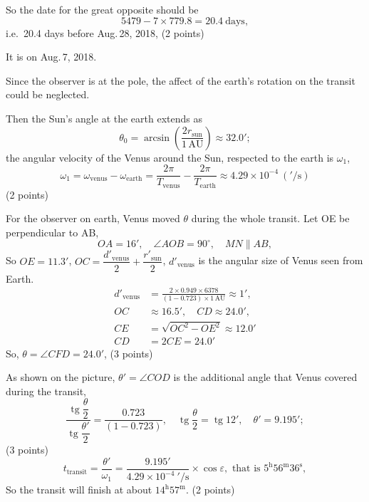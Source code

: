 So the date for the great opposite should be
\[
5479 - 7\times 779.8 = 20.4\ \mathrm{days},
\]
i.e.\ 20.4 days before Aug.\,28, 2018, \hfill(2 points)

It is on Aug.\,7, 2018.

Since the observer is at the pole, the affect of the earth's rotation on the
transit could be neglected.

Then the Sun's angle at the earth extends as
\[
\theta_0 = \arcsin\!\left(\frac{2r_{\mathrm{sun}}}{1\,\mathrm{AU}}\right)
 \approx 32.0';
\]
the angular velocity of the Venus around the Sun, respected to the earth is
$\omega_1$,
\[
\omega_1 = \omega_{\mathrm{venus}} - \omega_{\mathrm{earth}}
 = \frac{2\pi}{T_{\mathrm{venus}}} - \frac{2\pi}{T_{\mathrm{earth}}}
 \approx 4.29\times 10^{-4}\ ('/\mathrm{s})
\]
\hfill(2 points)

For the observer on earth, Venus moved $\theta$ during the whole transit. Let
OE be perpendicular to AB,
\[
OA = 16', \quad \angle AOB = 90^\circ, \quad MN \parallel AB,
\]
So $OE = 11.3'$,
$OC = \dfrac{d'_{\mathrm{venus}}}{2} + \dfrac{r'_{\mathrm{sun}}}{2}$,
$d'_{\mathrm{venus}}$ is the angular size of Venus seen from Earth.
\begin{align*}
d'_{\mathrm{venus}} &= \frac{2\times 0.949\times 6378}
                           {(1-0.723)\times 1\,\mathrm{AU}} \approx 1',\\
OC &\approx 16.5', \quad CD \approx 24.0',\\
CE &= \sqrt{OC^2 - OE^2} \approx 12.0'\\
CD &= 2CE = 24.0'
\end{align*}
So, $\theta = \angle CFD = 24.0'$, \hfill(3 points)

As shown on the picture, $\theta' = \angle COD$ is the additional angle that
Venus covered during the transit,
\[
\frac{\operatorname{tg}\dfrac{\theta}{2}}{\operatorname{tg}\dfrac{\theta'}{2}}
 = \frac{0.723}{(1-0.723)}, \quad
\operatorname{tg}\frac{\theta}{2} = \operatorname{tg} 12', \quad
\theta' = 9.195';
\]
\hfill(3 points)
\[
t_{\mathrm{transit}} = \frac{\theta'}{\omega_1}
 = \frac{9.195'}{4.29\times 10^{-4}\ '/\mathrm{s}}\times\cos\varepsilon,
 \text{ that is } 5^{\mathrm{h}}56^{\mathrm{m}}36^{\mathrm{s}},
\]
So the transit will finish at about $14^{\mathrm{h}}57^{\mathrm{m}}$.
\hfill(2 points)

